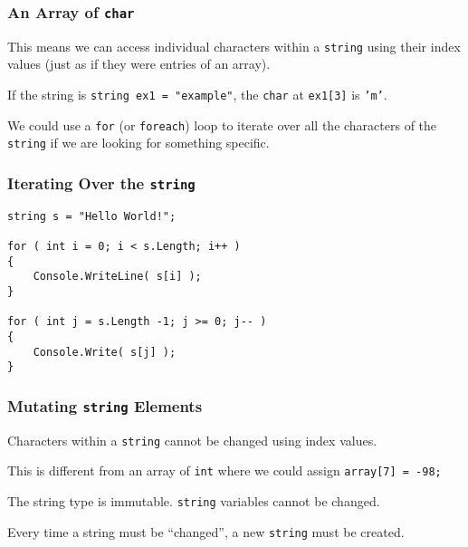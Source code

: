 \begin{frame}
\frametitle{An Array of \texttt{char}}

This means we can access individual characters within a \texttt{string} using their index values (just as if they were entries of an array).

If the string is \texttt{string ex1 = "example"}, the \texttt{char} at \texttt{ex1[3]} is \texttt{'m'}.

We could use a \texttt{for} (or \texttt{foreach}) loop to iterate over all the characters of the \texttt{string} if we are looking for something specific.

\end{frame}

\begin{frame}[fragile]
\frametitle{Iterating Over the \texttt{string}}

\begin{verbatim}
string s = "Hello World!";

for ( int i = 0; i < s.Length; i++ )
{
    Console.WriteLine( s[i] );
}

for ( int j = s.Length -1; j >= 0; j-- )
{
    Console.Write( s[j] );
}
\end{verbatim}

\end{frame}

\begin{frame}
\frametitle{Mutating \texttt{string} Elements}

Characters within a \texttt{string} cannot be changed using index values.

This is different from an array of \texttt{int} where we could assign \texttt{array[7] = -98;}

The string type is \alert{immutable}. \texttt{string} variables cannot be changed.

Every time a string must be ``changed'', a new \texttt{string} must be created.

\end{frame}

